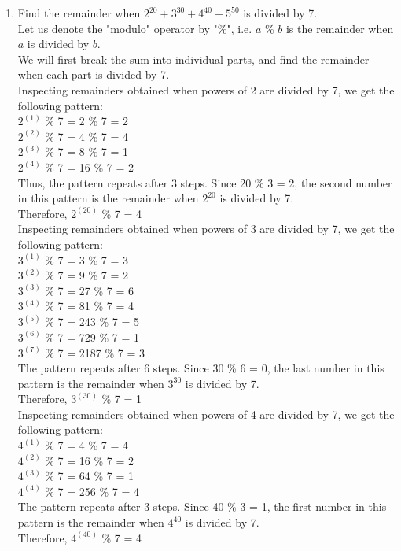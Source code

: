 \documentclass[a4paper,12pt]{article} %
\begin{document}
\begin{enumerate}

\item Find the remainder when $2^{20} + 3^{30} + 4^{40} + 5^{50}$ is divided by 7.\\
	Let us denote the "modulo" operator by "\%", i.e. $a$ \% $b$ is the remainder when $a$ is divided by $b$.\\
	We will first break the sum into individual parts, and find the remainder when each part is divided by 7.\\
	\subitem Inspecting remainders obtained when powers of 2 are divided by 7, we get the following pattern:\\
		$2^{(1)}$ \% 7 = 2  \% 7 = 2\\
		$2^{(2)}$ \% 7 = 4  \% 7 = 4\\
		$2^{(3)}$ \% 7 = 8  \% 7 = 1\\
		$2^{(4)}$ \% 7 = 16 \% 7 = 2\\
		Thus, the pattern repeats after 3 steps. Since 20 \% 3 = 2, the second number in this pattern is the remainder when $2^{20}$ is divided by 7.\\
		Therefore, $2^{(20)}$ \% 7 = 4\\

	\subitem Inspecting remainders obtained when powers of 3 are divided by 7, we get the following pattern:\\
		$3^{(1)}$ \% 7 = 3 \% 7 = 3\\
		$3^{(2)}$ \% 7 = 9 \% 7 = 2\\
		$3^{(3)}$ \% 7 = 27 \% 7 = 6\\
		$3^{(4)}$ \% 7 = 81 \% 7 = 4\\
		$3^{(5)}$ \% 7 = 243 \% 7 = 5\\
		$3^{(6)}$ \% 7 = 729 \% 7 = 1\\
		$3^{(7)}$ \% 7 = 2187 \% 7 = 3\\
		The pattern repeats after 6 steps. Since 30 \% 6 = 0, the last number in this pattern is the remainder when $3^{30}$ is divided by 7.\\
		Therefore, $3^{(30)}$ \% 7 = 1\\

	\subitem Inspecting remainders obtained when powers of 4 are divided by 7, we get the following pattern:\\
		$4^{(1)}$ \% 7 = 4 \% 7 = 4\\
		$4^{(2)}$ \% 7 = 16 \% 7 = 2\\
		$4^{(3)}$ \% 7 = 64 \% 7 = 1\\
		$4^{(4)}$ \% 7 = 256 \% 7 = 4\\
		The pattern repeats after 3 steps. Since 40 \% 3 = 1, the first number in this pattern is the remainder when $4^{40}$ is divided by 7.\\
		Therefore, $4^{(40)}$ \% 7 = 4\\


\end{enumerate}
\end{document}

